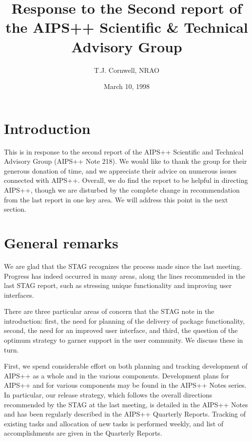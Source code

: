 


\title{Response to the Second report of the AIPS++ Scientific \& Technical 
Advisory Group}

\author{T.J. Cornwell, NRAO}

\date{March 10, 1998}

\maketitle

\section{Introduction}

This is in response to the second report of the AIPS++ Scientific and
Technical Advisory Group (AIPS++ Note 218). We would like to thank the
group for their generous donation of time, and we appreciate their
advice on numerous issues connected with AIPS++. Overall, we do find
the report to be helpful in directing AIPS++, though we are disturbed
by the complete change in recommendation from the last report in one
key area. We will address this point in the next section.

\section{General remarks}

We are glad that the STAG recognizes the process made since the last
meeting. Progress has indeed occurred in many areas, along the lines
recommended in the last STAG report, such as stressing unique
functionality and improving user interfaces. 

There are three particular areas of concern that the STAG note in the
introduction: first, the need for planning of the delivery of package
functionality, second, the need for an improved user interface, and
third, the question of the optimum strategy to garner support in the
user community. We discuss these in turn.

First, we spend considerable effort on both planning and tracking
development of AIPS++ as a whole and in the various
components. Development plans for AIPS++ and for various components
may be found in the AIPS++ Notes series. In particular, our release
strategy, which follows the overall directions recommended by the STAG
at the last meeting, is detailed in the AIPS++ Notes and has been
regularly described in the AIPS++ Quarterly Reports. Tracking of
existing tasks and allocation of new tasks is performed weekly, and
list of accomplishments are given in the Quarterly Reports.

